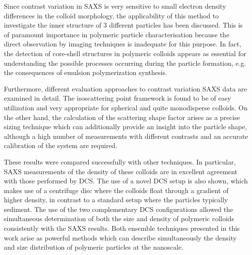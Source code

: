 Since contrast variation in SAXS is very sensitive to small electron density differences in the colloid morphology, the applicability of this method to investigate the inner structure of 3 different particles has been discussed. This is of paramount importance in polymeric particle characterisation because the direct observation by imaging techniques is inadequate for this purpose. In fact, the detection of core-shell structures in polymeric colloids appears as essential for understanding the possible processes occurring during the particle formation, e.g. the consequences of emulsion polymerization synthesis. 

Furthermore, different evaluation approaches to contrast variation SAXS data are examined in detail. The isoscattering point framework is found to be of easy utilization and very appropriate for spherical and quite monodisperse colloids. On the other hand, the calculation of the scattering shape factor arises as a precise sizing technique which can additionally provide an insight into the particle shape, although a high number of measurements with different contrasts and an accurate calibration of the system are required.

These results were compared successfully with other techniques. In particular, SAXS measurements of the density of these colloids are in excellent agreement with those performed by DCS. The use of a novel DCS setup is also shown, which makes use of a centrifuge disc where the colloids float through a gradient of higher density, in contrast to a standard setup where the particles typically sediment. The use of the two complementary DCS configurations allowed the simultaneous determination of both the size and density of polymeric colloids consistently with the SAXS results. Both ensemble techniques presented in this work arise as powerful methods which can describe simultaneously the density and size distribution of polymeric particles at the nanoscale.
